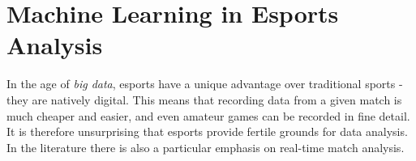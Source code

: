 \section{Machine Learning in Esports Analysis}

In the age of \textit{big data}, esports have a unique advantage over traditional sports - they are natively digital. This means that recording data from a given match is much cheaper and easier, and even amateur games can be recorded in fine detail. It is therefore unsurprising that esports provide fertile grounds for data analysis. In the literature there is also a particular emphasis on real-time match analysis.



\cite{trueskill-csdota}

